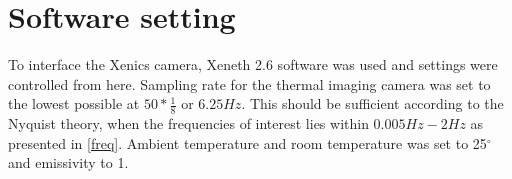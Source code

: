 \section{Software setting}

To interface the Xenics camera, Xeneth 2.6 software was used and settings were controlled from here.   
Sampling rate for the thermal imaging camera was set to the lowest possible at $50*\frac{1}{8}$ or $6.25 Hz$. This should be sufficient according to the Nyquist theory, when the frequencies of interest lies within $0.005 Hz-2 Hz$ as presented in \cref{freq}. Ambient temperature and room temperature was set to 25$^{\circ}$ and emissivity to 1. 



